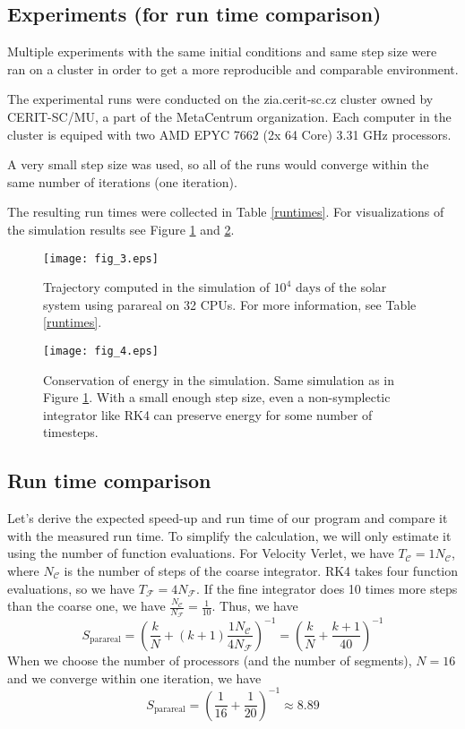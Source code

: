 \documentclass[conference]{IEEEtran}
\begin{document}
\subsection{Experiments (for run time comparison)}
Multiple experiments with the same initial conditions and same step size were ran on a cluster in order to get a more reproducible and comparable environment. 

The experimental runs were conducted on the zia.cerit-sc.cz cluster owned by CERIT-SC/MU, a part of the MetaCentrum organization. Each computer in the cluster is equiped with two AMD EPYC 7662 (2x 64 Core) 3.31 GHz processors.

A very small step size was used, so all of the runs would converge within the same number of iterations (one iteration).

The resulting run times were collected in Table \ref{runtimes}. For visualizations of the simulation results see Figure \ref{sim} and \ref{energy}.

\begin{figure}[htbp]
\centerline{\texttt{[image: fig\_3.eps]}}
\caption{Trajectory computed in the simulation of $10^4\text{ days}$ of the solar system using parareal on 32 CPUs. For more information, see Table \ref{runtimes}.}
\label{sim}
\end{figure}

\begin{figure}[htbp]
\centerline{\texttt{[image: fig\_4.eps]}}
\caption{Conservation of energy in the simulation. Same simulation as in Figure \ref{sim}. With a small enough step size, even a non-symplectic integrator like RK4 can preserve energy for some number of timesteps.}
\label{energy}
\end{figure}

\subsection{Run time comparison}
Let's derive the expected speed-up and run time of our program and compare it with the measured run time. To simplify the calculation, we will only estimate it using the number of function evaluations. For Velocity Verlet, we have $T_\mathcal{C} = 1N_\mathcal{C}$, where $N_\mathcal{C}$ is the number of steps of the coarse integrator. RK4 takes four function evaluations, so we have $T_\mathcal{F} = 4N_\mathcal{F}$. If the fine integrator does 10 times more steps than the coarse one, we have $\frac{N_\mathcal{C}}{N_\mathcal{F}} = \frac{1}{10}$. Thus, we have
$$
S_\text{parareal} = \left(\frac{k}{N} + (k+1)\frac{1N_\mathcal{C}}{4N_\mathcal{F}}\right)^{-1} = \left(\frac{k}{N} + \frac{k+1}{40}\right)^{-1}
$$
When we choose the number of processors (and the number of segments), $N = 16$ and we converge within one iteration, we have
$$
S_\text{parareal} = \left(\frac{1}{16} + \frac{1}{20}\right)^{-1} \approx 8.89
$$
\end{document}
